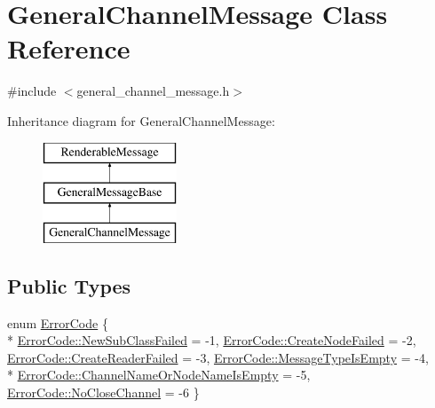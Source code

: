 \hypertarget{classGeneralChannelMessage}{\section{General\-Channel\-Message Class Reference}
\label{classGeneralChannelMessage}
}


{\ttfamily \#include $<$general\-\_\-channel\-\_\-message.\-h$>$}

Inheritance diagram for General\-Channel\-Message\-:\begin{figure}[H]
\begin{center}
\leavevmode
\includegraphics[height=3.000000cm]{classGeneralChannelMessage}
\end{center}
\end{figure}
\subsection*{Public Types}
\begin{DoxyCompactItemize}
\item 
enum \hyperlink{classGeneralChannelMessage_a4273153a78b91f1bbc1005c7fc83a42b}{Error\-Code} \{ \\*
\hyperlink{classGeneralChannelMessage_a4273153a78b91f1bbc1005c7fc83a42ba2f11a39e60eea72e5258966863e92dbb}{Error\-Code\-::\-New\-Sub\-Class\-Failed} = -\/1, 
\hyperlink{classGeneralChannelMessage_a4273153a78b91f1bbc1005c7fc83a42ba6e17b68c7b260823b72268f4abaa63d8}{Error\-Code\-::\-Create\-Node\-Failed} = -\/2, 
\hyperlink{classGeneralChannelMessage_a4273153a78b91f1bbc1005c7fc83a42baf3e17a336aaf0ce3288af8cc88f84acd}{Error\-Code\-::\-Create\-Reader\-Failed} = -\/3, 
\hyperlink{classGeneralChannelMessage_a4273153a78b91f1bbc1005c7fc83a42ba2bce9ea8de55f42d5c705d31d88b580c}{Error\-Code\-::\-Message\-Type\-Is\-Empty} = -\/4, 
\\*
\hyperlink{classGeneralChannelMessage_a4273153a78b91f1bbc1005c7fc83a42ba1c1458480e4efd15e595dd35828d389d}{Error\-Code\-::\-Channel\-Name\-Or\-Node\-Name\-Is\-Empty} = -\/5, 
\hyperlink{classGeneralChannelMessage_a4273153a78b91f1bbc1005c7fc83a42bae125b94e8445980203008e098f9c713f}{Error\-Code\-::\-No\-Close\-Channel} = -\/6
 \}
\end{DoxyCompactItemize}
